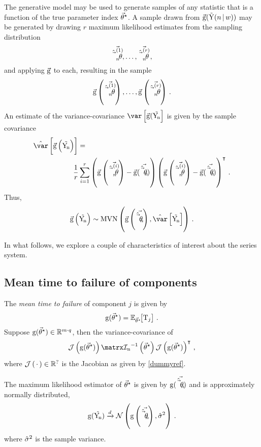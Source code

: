 \documentclass[../main.tex]{subfiles}
\begin{document}
The generative model may be used to generate samples of any statistic that is a function of the true parameter index ${\vec{\theta}}^{\star}$. A sample drawn from $\vec{\operatorname{g}}(\mathrm{\vec{Y}}(n {\,|\,} w))$ may be generated by drawing $r$ maximum likelihood estimates from the sampling distribution
\begin{equation}
    \vec{\hat{\vec{\theta}}_{n}^{(1)}}, \ldots, \vec{\hat{\vec{\theta}}_{n}^{(r)}}\,,
\end{equation}
and applying $\vec{\operatorname{g}}$ to each, resulting in the sample
\begin{equation}
\label{eq:phi_sample}
    \vec{\operatorname{g}}\left(\vec{\hat{\vec{\theta}}_{n}^{(1)}}\right),
    \ldots,
    \vec{\operatorname{g}}\left(\vec{\hat{\vec{\theta}}_{n}^{(r)}}\right)\,.
\end{equation}
An estimate of the variance-covariance $\var\left[\vecstat(\sampdu\right]$ is given by the sample covariance
\begin{equation}
\begin{split}
    \estimator{\var}\left[\vecstat\left(\sampdu\right)\right] &=\\
    & \!\!\!\! \frac{1}{r} \sum_{i=1}^{r}
            \left(\vecstat\left(\mleui{i}\right) - \vecstat(\mleu)\right)
            \left(\vecstat\left(\mleui{i}\right) - \vecstat(\mleu)\right)^\intercal\,.
\end{split}
\end{equation}
Thus,
\begin{equation}
    \vecstat\left(\sampdu\right) \sim \mvn\left(\vecstat\left(\mleu\right), \estimator{\var}\left[\sampdu\right] \right)\,.
\end{equation}

In what follows, we explore a couple of characteristics of interest about the series system.
\subsection{Mean time to failure of components}
The \emph{mean time to failure} of component $j$ is given by
\begin{equation}
    \operatorname{g}({\vec{\theta}}^{\star}) = \operatorname{\mathbb{E}}_{{\vec{\theta}}^{\star}}\!\! \left[\mathrm{T}_j\right]\,.
\end{equation}
Suppose $\operatorname{g}({\vec{\theta}}^{\star}) \in \mathbb{R}^{m \cdot q}$, then the variance-covariance of 
\begin{equation}
    \jacobian\left(\scalarstat(\tparam\sysparamvec)\right) \infomatrxn^{-1}\left(\tparam\sysparamvec\right) \jacobian\left(\scalarstat(\tparam\sysparamvec)\right)^\intercal\,,
\end{equation}
where $\operatorname{\mathcal{J}}\left(\,\cdot\,\right) \in \mathbb{R}^{?}$ is the Jacobian as 
given by \cref{dummyref}.

The maximum likelihood estimator of ${\vec{\theta}}^{\star}$ is given by $\operatorname{g}(\vec{\hat{\vec{\theta}}_{n}})$ and is approximately normally distributed,
\begin{equation}
\operatorname{g}(\mathrm{\vec{Y_{\!n}}}) \xrightarrow{d} \mathcal{N}\left(\operatorname{g}\left(\vec{\hat{\vec{\theta}}_{n}}\right), \hat{\sigma}^2\right)\,.
\end{equation}
where $\hat{\sigma}^2$ is the sample variance.
\end{document}
